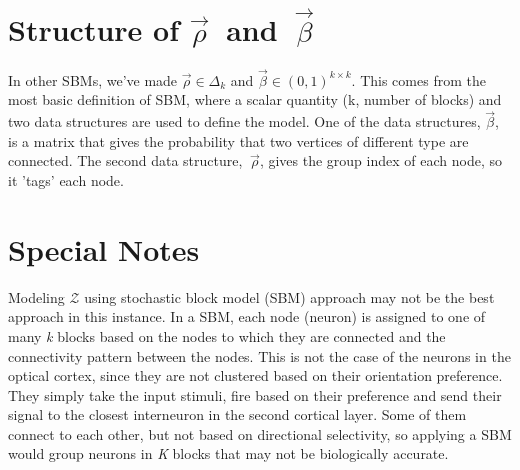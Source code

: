 \documentclass[paper=a4, fontsize=11pt]{scrartcl} %
\numberwithin{equation}{section} %
\numberwithin{figure}{section} %
\numberwithin{table}{section} %
\begin{document}
\section{Structure of $\vec{\rho} \ $ and $\ \vec{\beta}$}

In other SBMs, we've made $\vec{\rho} \in \Delta_k$ and $\vec{\beta} \in (0,1)^{k \times k}$. This comes from the most basic definition of SBM, where a scalar quantity (k, number of blocks) and two data structures are used to define the model. One of the data structures, $\vec{\beta}$,  is a matrix that gives the probability that two vertices of different type are connected.  The second data structure, $\ \vec{\rho}$, gives the group index of each node, so it 'tags' each node.

\section{Special Notes}
Modeling  $\mathcal{Z}$ using  stochastic block model (SBM) approach may not be the best approach in this instance. In a SBM, each node (neuron) is assigned to one of many \textit{k} blocks based on the nodes to which they are connected and the connectivity pattern between the nodes. This is not the case of the neurons in the optical cortex, since they are not clustered based on their orientation preference. They simply take the input stimuli, fire based on their preference and send their signal to the closest interneuron in the second cortical layer. Some of them connect to each other, but not based on directional selectivity, so applying a SBM would group neurons in \textit{K} blocks that may not be biologically accurate.
\end{document}
